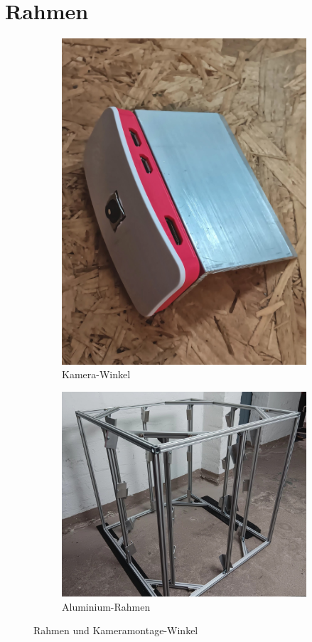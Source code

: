 \documentclass[./00PhotoBox.tex]{subfiles}
\begin{document}
\section{Rahmen}

\begin{figure}
    \centering
    \begin{subfigure}{0.45\textwidth}
        \includegraphics[height=0.9\linewidth]{./img/aluwinkel.jpg}
        \centering
        \caption{Kamera-Winkel} %
        \label{img:aluwinkel} %
    \end{subfigure}
    \begin{subfigure}{0.45\textwidth}
        \includegraphics[height=0.8\linewidth]{./img/alurahmen.jpg}
        \centering
        \caption{Aluminium-Rahmen} %
        \label{img:alurahmen} %
    \end{subfigure}
    \caption{Rahmen und Kameramontage-Winkel} %
\end{figure}
\end{document}

